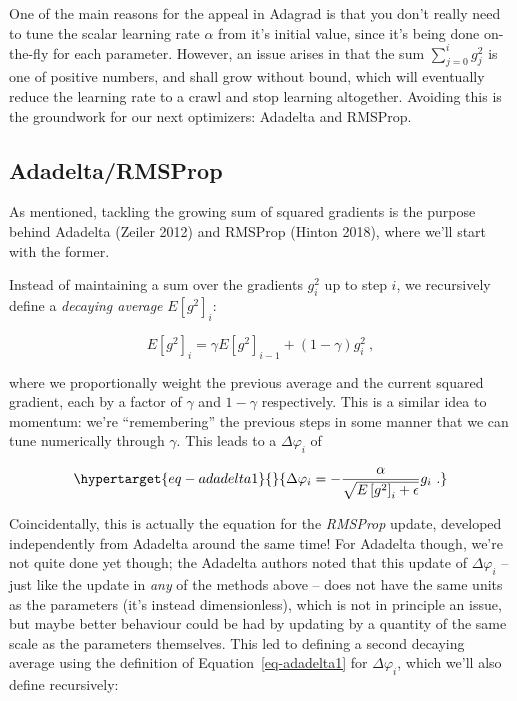 \documentclass[
  11pt,
  numbers=noendperiod]{book}
\begin{document}
One of the main reasons for the appeal in Adagrad is that you don't
really need to tune the scalar learning rate \(\alpha\) from it's
initial value, since it's being done on-the-fly for each parameter.
However, an issue arises in that the sum \(\sum^{i}_{j=0}g^2_{j}\) is
one of positive numbers, and shall grow without bound, which will
eventually reduce the learning rate to a crawl and stop learning
altogether. Avoiding this is the groundwork for our next optimizers:
Adadelta and RMSProp.

\hypertarget{adadeltarmsprop}{%
\subsection{Adadelta/RMSProp}\label{adadeltarmsprop}}

As mentioned, tackling the growing sum of squared gradients is the
purpose behind Adadelta (Zeiler 2012) and RMSProp (Hinton 2018), where
we'll start with the former.

Instead of maintaining a sum over the gradients \(g_i^2\) up to step
\(i\), we recursively define a \emph{decaying average}
\(E\left[g^2\right]_i\):

\[
E\left[g^2\right]_i=\gamma E\left[g^2\right]_{i-1}+(1-\gamma) g_i^2~,
\]

where we proportionally weight the previous average and the current
squared gradient, each by a factor of \(\gamma\) and \(1-\gamma\)
respectively. This is a similar idea to momentum: we're ``remembering''
the previous steps in some manner that we can tune numerically through
\(\gamma\). This leads to a \(\Delta \varphi_i\) of

\begin{equation}\protect\hypertarget{eq-adadelta1}{}{
\Delta \varphi_i = - \frac{\alpha}{\sqrt{E\left[g^2\right]_i+ \epsilon}} g_{i} ~.
}\label{eq-adadelta1}\end{equation}

Coincidentally, this is actually the equation for the \emph{RMSProp}
update, developed independently from Adadelta around the same time! For
Adadelta though, we're not quite done yet though; the Adadelta authors
noted that this update of \(\Delta \varphi_i\) -- just like the update
in \emph{any} of the methods above -- does not have the same units as
the parameters (it's instead dimensionless), which is not in principle
an issue, but maybe better behaviour could be had by updating by a
quantity of the same scale as the parameters themselves. This led to
defining a second decaying average using the definition of
Equation~\ref{eq-adadelta1} for \(\Delta \varphi_i\), which we'll also
define recursively:
\end{document}
